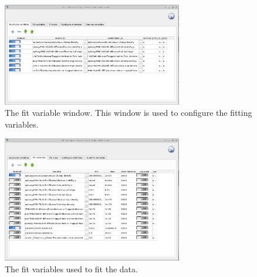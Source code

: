   

\begin{figure}[H]
\centering
\includegraphics[width=0.7\textwidth]{./images/fit/fit_duplicate_vars.png}
\caption{The fit variable window. This window is used to configure the fitting variables.}
\label{fig:fit_duplicate_vars}
\end{figure}

\begin{figure}[H]
\centering
\includegraphics[width=0.7\textwidth]{./images/fit/fit_vars.png}
\caption{The fit variables used to fit the data.}
\label{fig:fit_vars}
\end{figure}

